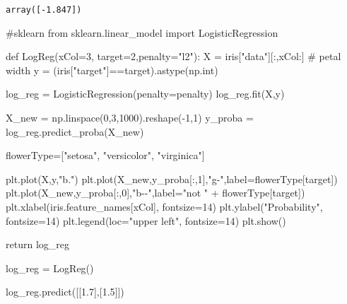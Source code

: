 \documentclass[
  letterpaper,
  DIV=11,
  numbers=noendperiod]{scrreprt}
\newenvironment{Shaded}{\begin{snugshade}}{\end{snugshade}}
\newcommand{\BuiltInTok}[1]{\textcolor[rgb]{0.00,0.23,0.31}{#1}}
\newcommand{\CommentTok}[1]{\textcolor[rgb]{0.37,0.37,0.37}{#1}}
\newcommand{\ControlFlowTok}[1]{\textcolor[rgb]{0.00,0.23,0.31}{#1}}
\newcommand{\DecValTok}[1]{\textcolor[rgb]{0.68,0.00,0.00}{#1}}
\newcommand{\FloatTok}[1]{\textcolor[rgb]{0.68,0.00,0.00}{#1}}
\newcommand{\ImportTok}[1]{\textcolor[rgb]{0.00,0.46,0.62}{#1}}
\newcommand{\KeywordTok}[1]{\textcolor[rgb]{0.00,0.23,0.31}{#1}}
\newcommand{\NormalTok}[1]{\textcolor[rgb]{0.00,0.23,0.31}{#1}}
\newcommand{\OperatorTok}[1]{\textcolor[rgb]{0.37,0.37,0.37}{#1}}
\newcommand{\StringTok}[1]{\textcolor[rgb]{0.13,0.47,0.30}{#1}}
\begin{document}
\begin{verbatim}
array([-1.847])
\end{verbatim}

\begin{Shaded}
\begin{Highlighting}[]
\CommentTok{\#sklearn}
\ImportTok{from}\NormalTok{ sklearn.linear\_model }\ImportTok{import}\NormalTok{ LogisticRegression}

\KeywordTok{def}\NormalTok{ LogReg(xCol}\OperatorTok{=}\DecValTok{3}\NormalTok{, target}\OperatorTok{=}\DecValTok{2}\NormalTok{,penalty}\OperatorTok{=}\StringTok{"l2"}\NormalTok{):}
\NormalTok{    X }\OperatorTok{=}\NormalTok{ iris[}\StringTok{"data"}\NormalTok{][:,xCol:]  }\CommentTok{\# petal width}
\NormalTok{    y }\OperatorTok{=}\NormalTok{ (iris[}\StringTok{"target"}\NormalTok{]}\OperatorTok{==}\NormalTok{target).astype(np.}\BuiltInTok{int}\NormalTok{)}

\NormalTok{    log\_reg }\OperatorTok{=}\NormalTok{ LogisticRegression(penalty}\OperatorTok{=}\NormalTok{penalty)}
\NormalTok{    log\_reg.fit(X,y)}

\NormalTok{    X\_new }\OperatorTok{=}\NormalTok{ np.linspace(}\DecValTok{0}\NormalTok{,}\DecValTok{3}\NormalTok{,}\DecValTok{1000}\NormalTok{).reshape(}\OperatorTok{{-}}\DecValTok{1}\NormalTok{,}\DecValTok{1}\NormalTok{)}
\NormalTok{    y\_proba }\OperatorTok{=}\NormalTok{ log\_reg.predict\_proba(X\_new)}

\NormalTok{    flowerType}\OperatorTok{=}\NormalTok{[}\StringTok{"setosa"}\NormalTok{, }\StringTok{"versicolor"}\NormalTok{, }\StringTok{"virginica"}\NormalTok{]}
 
\NormalTok{    plt.plot(X,y,}\StringTok{"b."}\NormalTok{)}
\NormalTok{    plt.plot(X\_new,y\_proba[:,}\DecValTok{1}\NormalTok{],}\StringTok{"g{-}"}\NormalTok{,label}\OperatorTok{=}\NormalTok{flowerType[target])}
\NormalTok{    plt.plot(X\_new,y\_proba[:,}\DecValTok{0}\NormalTok{],}\StringTok{"b{-}{-}"}\NormalTok{,label}\OperatorTok{=}\StringTok{"not "} \OperatorTok{+}\NormalTok{ flowerType[target])}
\NormalTok{    plt.xlabel(iris.feature\_names[xCol], fontsize}\OperatorTok{=}\DecValTok{14}\NormalTok{)}
\NormalTok{    plt.ylabel(}\StringTok{"Probability"}\NormalTok{, fontsize}\OperatorTok{=}\DecValTok{14}\NormalTok{)}
\NormalTok{    plt.legend(loc}\OperatorTok{=}\StringTok{"upper left"}\NormalTok{, fontsize}\OperatorTok{=}\DecValTok{14}\NormalTok{)}
\NormalTok{    plt.show()}
    
    \ControlFlowTok{return}\NormalTok{ log\_reg}

\NormalTok{log\_reg }\OperatorTok{=}\NormalTok{ LogReg()}

\NormalTok{log\_reg.predict([[}\FloatTok{1.7}\NormalTok{],[}\FloatTok{1.5}\NormalTok{]])}
\end{Highlighting}
\end{Shaded}
\end{document}
